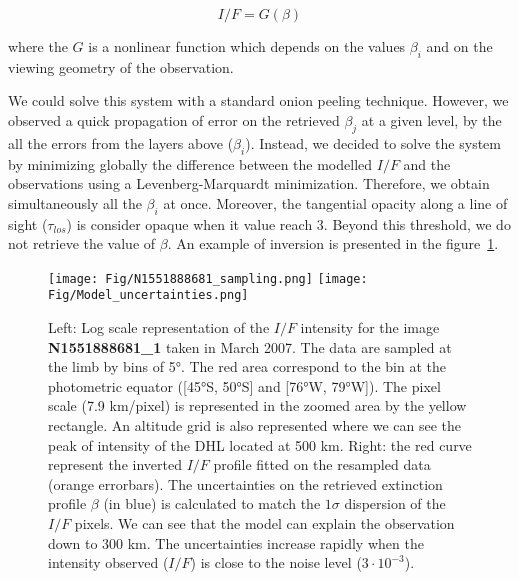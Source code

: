 \begin{equation}
    I/F = G(\beta)
\end{equation}

where the ${G}$ is a nonlinear function which depends on the values $\beta_i$ and on the viewing geometry of the observation.

We could solve this system with a standard onion peeling technique.
However, we observed a quick propagation of error on the retrieved $\beta_j$ at a given level, by the all the errors from the
layers above ($\beta_i$).
Instead, we decided to solve the system by minimizing globally the difference between the modelled $I/F$ and the observations
using a Levenberg-Marquardt minimization. Therefore, we obtain simultaneously all the $\beta_i$ at once.
Moreover, the tangential opacity along a line of sight ($\tau_{los}$) is consider opaque when it value reach 3.
Beyond this threshold, we do not retrieve the value of $\beta$.
An example of inversion is presented in the figure~\ref{fig:model_uncertainties}.

\begin{figure}[!ht]
    \centering
    \texttt{[image: Fig/N1551888681\_sampling.png]}
    \texttt{[image: Fig/Model\_uncertainties.png]}
    \caption{Left: Log scale representation of the $I/F$ intensity for the image
             \textbf{N1551888681\_1} taken in March 2007. The data are sampled at the limb by
             bins of \ang{5}. The red area correspond to the bin at the photometric
             equator ([\ang{45}S, \ang{50}S] and [\ang{76}W, \ang{79}W]). The pixel scale
             (7.9 km/pixel) is represented in the zoomed area by the yellow rectangle.
             An altitude grid is also represented where we can see the peak of intensity of the DHL
             located at 500 km. Right: the red curve represent the inverted $I/F$ profile fitted
             on the resampled data (orange errorbars). The uncertainties on the retrieved
             extinction profile $\beta$ (in blue) is calculated to match the $1 \sigma$ dispersion
             of the $I/F$ pixels. We can see that the model can explain the observation down to 300 km.
             The uncertainties increase rapidly when the intensity observed ($I/F$) is close
             to the noise level ($3\cdot10^{-3}$).}
    \label{fig:model_uncertainties}
\end{figure}
